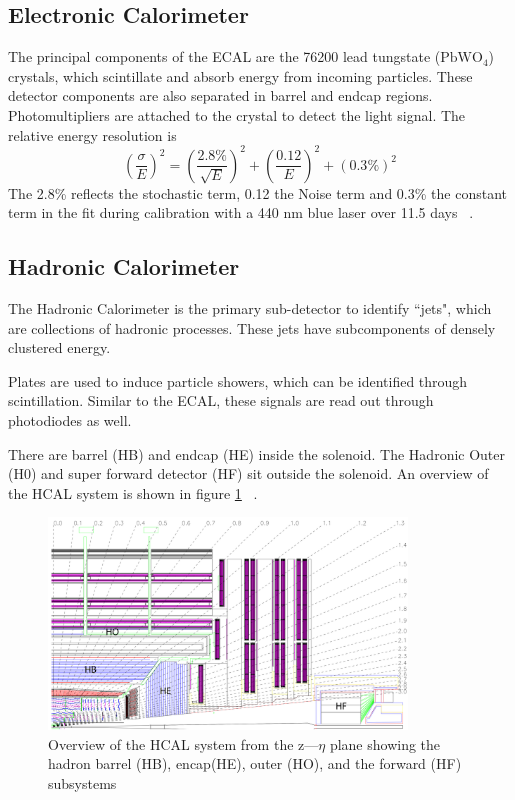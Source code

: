 \subsection{Electronic Calorimeter}

The principal components of the ECAL are the 76200 lead tungstate ($\text{PbWO}_4$) crystals, which scintillate and absorb energy from incoming particles. These detector components are also separated in barrel and endcap regions. Photomultipliers are attached to the crystal to detect the light signal. The relative energy resolution is 
\begin{equation*}
\label{eq:ecal}
\left(\frac{\sigma}{E}\right)^2 = \left( \frac{2.8\%}{\sqrt{E}}  \right)^2 + \left( \frac{0.12}{E}  \right)^2 + (0.3\%)^2 
\end{equation*}
The 2.8\% reflects the stochastic term, 0.12 the Noise term and 0.3\% the constant term in the fit during calibration with a 440 nm blue laser over 11.5 days ~\cite{Chatrchyan:2008zzk,Eichhorn:2112017}. 

\subsection{Hadronic Calorimeter} 
The Hadronic Calorimeter is the primary sub-detector to identify ``jets", which are collections of hadronic processes. These jets have subcomponents of densely clustered energy. 

Plates are used to induce particle showers, which can be identified through scintillation. Similar to the ECAL, these signals are read out through photodiodes as well. 

There are barrel (HB) and endcap (HE) inside the solenoid. The Hadronic Outer (H0) and super forward detector (HF) sit outside the solenoid. An overview of the HCAL system is shown in figure \ref{fig:hcal} ~\cite{Chatrchyan:2008zzk,Eichhorn:2112017}. 

\begin{figure}[ht!b]
  \centering
\includegraphics[width=0.85\textwidth]{figures/HCAL.png}    
    \caption{\label{fig:hcal} Overview of the HCAL system from the z---$\eta$ plane showing the hadron barrel (HB), encap(HE), outer (HO), and the forward (HF) subsystems ~\cite{Chatrchyan:2008zzk}}
\end{figure}




